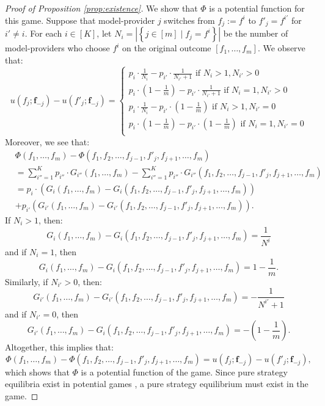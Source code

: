 \documentclass[letterpaper,11pt]{article}
\theoremstyle{plain}
\begin{document}
\begin{proof}[Proof of Proposition \ref{prop:existence}]
We show that $\Phi$ is a potential function for this game. Suppose that model-provider $j$ switches from $f_j := f^i$ to $f'_j = f^{i'}$ for $i' \neq i$. For each $i \in [K]$, let $N_i = |\left\{j \in [m] \mid f_j = f^i\right\}|$ be the number of model-providers who choose $f^i$ on the original outcome $[f_1, \ldots, f_m]$. We observe that:
\[ u(f_j; \mathbf{f}_{-j}) - u(f'_{j}; \mathbf{f}_{-j}) = 
\begin{cases}
p_i \cdot \frac{1}{N_i} - p_{i'} \cdot \frac{1}{N_{i'}+1}  \text{ if } N_i > 1, N_{i'} > 0 \\
p_i \cdot \left(1 - \frac{1}{m} \right) - p_{i'} \cdot \frac{1}{N_{i'}+1} \text{ if } N_i = 1, N_{i'} > 0 \\
p_i \cdot \frac{1}{N_i} - p_{i'} \cdot \left(1 - \frac{1}{m} \right) \text{ if } N_i > 1, N_{i'} = 0 \\
p_i \cdot \left(1 - \frac{1}{m} \right) - p_{i'} \cdot \left(1 - \frac{1}{m} \right)  \text{ if } N_i = 1, N_{i'} = 0 \\
\end{cases}
\]
Moreover,  we see that: 
\begin{align*}
  &\Phi(f_1, \ldots, f_m) - \Phi(f_1, f_2, \ldots, f_{j-1}, f'_j, f_{j+1}, \ldots, f_m) \\
  &=   \sum_{i''=1}^K p_{i''} \cdot G_{i''}(f_1, \ldots, f_m) - \sum_{i''=1}^K p_{i''} \cdot  G_{i''}(f_1, f_2, \ldots, f_{j-1}, f'_j, f_{j+1}, \ldots, f_m) \\
  &= p_i \cdot \left(G_i(f_1, \ldots, f_m) - G_i(f_1, f_2, \ldots, f_{j-1}, f'_j, f_{j+1}, \ldots, f_m)\right)\\
  &+ p_{i'} \left(G_{i'}(f_1, \ldots, f_m) - G_{i'}(f_1, f_2, \ldots, f_{j-1}, f'_j, f_{j+1}, \ldots, f_m)\right).
\end{align*}
If $N_i > 1$, then:
\[G_i(f_1, \ldots, f_m) - G_i(f_1, f_2, \ldots, f_{j-1}, f'_j, f_{j+1}, \ldots, f_m) = \frac{1}{N^i}\]
and if $N_i = 1$, then 
\[G_i(f_1, \ldots, f_m) - G_i(f_1, f_2, \ldots, f_{j-1}, f'_j, f_{j+1}, \ldots, f_m) = 1 - \frac{1}{m}.\]
Similarly, if $N_{i'} > 0$, then:
\[G_{i'}(f_1, \ldots, f_m) - G_{i'}(f_1, f_2, \ldots, f_{j-1}, f'_j, f_{j+1}, \ldots, f_m) = -\frac{1}{N^{i'} + 1}\]
and if $N_{i'} = 0$, then 
\[G_{i'}(f_1, \ldots, f_m) - G_i(f_1, f_2, \ldots, f_{j-1}, f'_j, f_{j+1}, \ldots, f_m) = - \left(1 - \frac{1}{m}\right).\]
Altogether, this implies that:
\[\Phi(f_1, \ldots, f_m) - \Phi(f_1, f_2, \ldots, f_{j-1}, f'_j, f_{j+1}, \ldots, f_m) = u(f_j; \mathbf{f}_{-j}) - u(f'_{j}; \mathbf{f}_{-j}),\]
which shows that $\Phi$ is a potential function of the game. Since pure strategy equilibria exist in potential games \citep{R73, MS96}, a pure strategy equilibrium must exist in the game.   
\end{proof}
\end{document}

